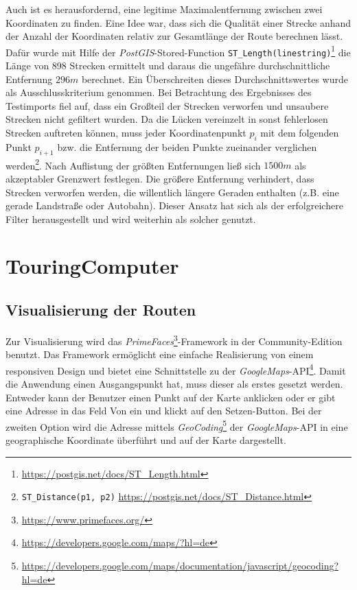 \documentclass[a4paper,11pt,utf8]{scrartcl}
\begin{document}
Auch ist es herausfordernd, eine legitime Maximalentfernung zwischen zwei Koordinaten zu finden. Eine Idee war, dass sich die Qualität einer Strecke anhand der Anzahl der Koordinaten relativ zur Gesamtlänge der Route berechnen lässt. Dafür wurde mit Hilfe der \textit{PostGIS}-Stored-Function \texttt{ST\_Length(linestring)}\footnote{\url{https://postgis.net/docs/ST_Length.html}} die Länge von 898 Strecken ermittelt und daraus die ungefähre durchschnittliche Entfernung $296 m$ berechnet. Ein Überschreiten dieses Durchschnittswertes wurde als Ausschlusskriterium genommen. Bei Betrachtung des Ergebnisses des Testimports fiel auf, dass ein Großteil der Strecken verworfen und unsaubere Strecken nicht gefiltert wurden. Da die \glqq Lücken\grqq{} vereinzelt in sonst fehlerlosen Strecken auftreten können, muss jeder Koordinatenpunkt $p_i$ mit dem folgenden Punkt $p_{i+1}$ bzw. die Entfernung der beiden Punkte zueinander verglichen werden\footnote{\texttt{ST\_Distance(p1, p2)} \url{https://postgis.net/docs/ST_Distance.html}}. Nach Auflistung der größten Entfernungen ließ sich $1500 m$ als akzeptabler Grenzwert festlegen. Die größere Entfernung verhindert, dass Strecken verworfen werden, die willentlich längere Geraden enthalten (z.B. eine gerade Landstraße oder Autobahn). Dieser Ansatz hat sich als der erfolgreichere Filter herausgestellt und wird weiterhin als solcher genutzt.

\section{TouringComputer}
\subsection{Visualisierung der Routen}
Zur Visualisierung wird das \textit{PrimeFaces}\footnote{\url{https://www.primefaces.org/}}-Framework in der Community-Edition benutzt. Das Framework ermöglicht eine einfache Realisierung von einem responsiven Design und bietet eine Schnittstelle zu der \textit{GoogleMaps}-API\footnote{\url{https://developers.google.com/maps/?hl=de}}. Damit die Anwendung einen Ausgangspunkt hat, muss dieser als erstes gesetzt werden. Entweder kann der Benutzer einen Punkt auf der Karte anklicken oder er gibt eine Adresse in das Feld  \glqq Von\grqq{} ein und klickt auf den Setzen-Button. Bei der zweiten Option wird die Adresse mittels \textit{GeoCoding}\footnote{\url{https://developers.google.com/maps/documentation/javascript/geocoding?hl=de}} der \textit{GoogleMaps}-API in eine geographische Koordinate überführt und auf der Karte dargestellt. 
\end{document}
